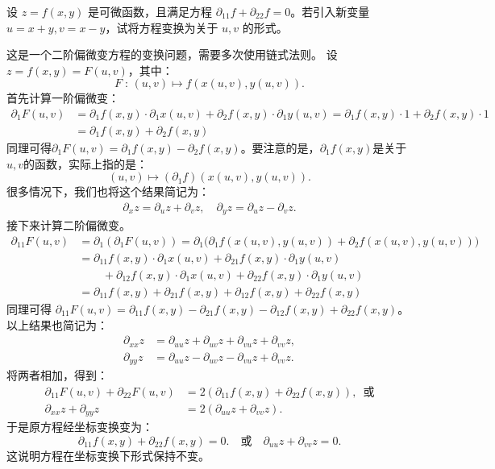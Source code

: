 \documentclass[12pt,UTF8]{ctexbook}
\begin{document}
\begin{et}
设 $z = f(x, y)$ 是可微函数，且满足方程 $\partial_{11} f + \partial_{22} f = 0$。若引入新变量 $u = x + y, v = x - y$，试将方程变换为关于 $u, v$ 的形式。
\end{et}
\begin{so}
这是一个二阶偏微变方程的变换问题，需要多次使用链式法则。
设$z = f(x,y) = F(u,v)$，其中：
$$ F\;:\, (u,v) \mapsto f(x(u,v),y(u,v)). $$
首先计算一阶偏微变：
\begin{align*}
    \partial_1 F(u,v) &= \partial_1 f(x,y)\cdot \partial_1 x(u,v) + \partial_2 f(x,y)\cdot \partial_1 y(u,v) =  \partial_1 f(x,y) \cdot 1 +  \partial_2 f(x,y) \cdot 1 \\
    &=  \partial_1 f(x,y) +  \partial_2 f(x,y)
\end{align*}
同理可得$\partial_1 F(u,v) = \partial_1 f(x,y) - \partial_2 f(x,y)$。要注意的是，$\partial_1 f(x,y)$是关于$u,v$的函数，实际上指的是：
$$ (u,v) \mapsto (\partial_1 f)(x(u,v),y(u,v)). $$
很多情况下，我们也将这个结果简记为：
\begin{align*}
\partial_x z = \partial_u z + \partial_v z, \quad \partial_y z = \partial_u z - \partial_v z.
\end{align*}
接下来计算二阶偏微变。
\begin{align*}
\partial_{11} F(u, v) &= \partial_1(\partial_1 F(u,v)) = \partial_1\Big(\partial_1 f(x(u,v),y(u,v)) +  \partial_2 f(x(u,v),y(u,v))\Big) \\
&= \partial_{11} f(x,y)\cdot  \partial_1 x(u,v) + \partial_{21} f(x,y)\cdot  \partial_1 y(u,v) \\
&\phantom{=+}+
 \partial_{12} f(x,y)\cdot  \partial_1 x(u,v) + \partial_{22} f(x,y)\cdot  \partial_1 y(u,v) \\
&=  \partial_{11} f(x,y) + \partial_{21} f(x,y) + \partial_{12} f(x,y) + \partial_{22} f(x,y)
\end{align*}
同理可得 $\partial_{11} F(u, v) = \partial_{11} f(x,y) - \partial_{21} f(x,y) - \partial_{12} f(x,y) + \partial_{22} f(x,y)$。以上结果也简记为：
\begin{align*}
\partial_{xx} z &= \partial_{uu} z + \partial_{uv} z + \partial_{vu} z + \partial_{vv} z, \\
\partial_{yy} z &= \partial_{uu} z - \partial_{uv} z - \partial_{vu} z + \partial_{vv} z.
\end{align*}
将两者相加，得到：
\begin{align*}
    \partial_{11} F(u, v) + \partial_{22} F(u, v) &= 2(\partial_{11} f(x,y) + \partial_{22} f(x,y)), \,\,\,\mbox{或}\\
     \partial_{xx} z + \partial_{yy} z &= 2(\partial_{uu} z + \partial_{vv} z).
\end{align*}
于是原方程经坐标变换变为：
$$ \partial_{11} f(x,y) + \partial_{22} f(x,y) = 0. \quad \mbox{或}\quad \partial_{uu} z + \partial_{vv} z = 0.$$
这说明方程在坐标变换下形式保持不变。
\end{so}
\end{document}
